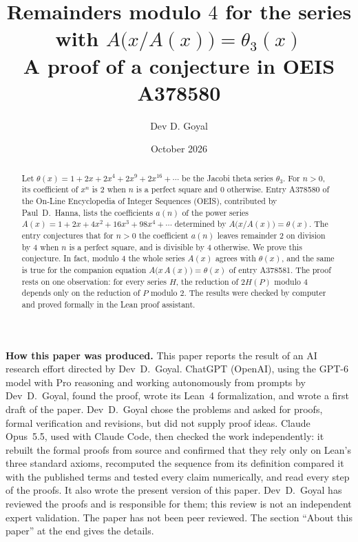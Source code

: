 \documentclass[11pt,a4paper]{article}
\title{Remainders modulo $4$ for the series with $A\bigl(x/A(x)\bigr)=\theta_3(x)$\\[6pt]\large A proof of a conjecture in OEIS A378580}
\author{Dev D. Goyal}
\date{October 2026}
\theoremstyle{definition}
\theoremstyle{remark}
\begin{document}
\maketitle
\begin{abstract}
Let $\theta(x)=1+2x+2x^4+2x^9+2x^{16}+\cdots$ be the Jacobi theta series $\theta_3$. For $n>0$, its coefficient of $x^n$ is $2$ when $n$ is a
perfect square and $0$ otherwise. Entry A378580 of the On-Line Encyclopedia of Integer Sequences (OEIS),
contributed by Paul~D.~Hanna, lists the coefficients $a(n)$ of the power series $A(x)=1+2x+4x^2+16x^3+98x^4+\cdots$
determined by $A\bigl(x/A(x)\bigr)=\theta(x)$. The entry conjectures that for $n>0$ the coefficient $a(n)$ leaves remainder $2$ on
division by $4$ when $n$ is a perfect square, and is divisible by $4$ otherwise. We prove this conjecture. In fact,
modulo $4$ the whole series $A(x)$ agrees with $\theta(x)$, and the same is true for the companion equation
$A\bigl(x\,A(x)\bigr)=\theta(x)$ of entry A378581. The proof rests on one observation: for every series $H$, the
reduction of $2H(P)$ modulo $4$ depends only on the reduction of $P$ modulo $2$. The results were checked by computer and proved
formally in the Lean proof assistant.
\end{abstract}
\begin{center}\begin{minipage}{0.88\linewidth}\small
\textbf{How this paper was produced.} This paper reports the result of an AI research effort directed by
Dev~D.~Goyal. ChatGPT (OpenAI), using the GPT-6 model with Pro reasoning and working autonomously from prompts by
Dev~D.~Goyal, found the proof, wrote its Lean~4 formalization, and wrote a first draft of the paper.
Dev~D.~Goyal chose the problems and asked for proofs, formal verification and revisions, but did not supply proof
ideas. Claude Opus~5.5, used with Claude Code, then checked the work independently: it rebuilt the formal proofs from
source and confirmed that they rely only on Lean's three standard axioms, recomputed the sequence from its definition
compared it with the published terms and tested every claim numerically, and read every step of the proofs. It also wrote the present
version of this paper.
Dev~D.~Goyal has reviewed the proofs and is responsible for them; this review is not an independent expert validation.
The paper has not been peer reviewed.
The section ``About this paper'' at the end gives the details.
\end{minipage}\end{center}
\end{document}
